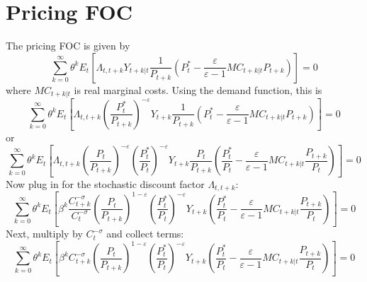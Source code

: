 \documentclass[12pt,a4paper]{article}
\begin{document}
\section{Pricing FOC}
The pricing FOC is given by
\begin{equation}\sum\limits_{k = 0}^\infty  {{\theta ^k}{E_t}\left[ {{\Lambda _{t,t + k}}{Y_{t + k|t}}\frac{1}{{{P_{t + k}}}}\left( {P_t^* - \frac{\varepsilon }{{\varepsilon  - 1}}M{C_{t + k|t}}{P_{t + k}}} \right)} \right]}  = 0\end{equation}
where ${M{C_{t + k|t}}}$ is real marginal costs. Using the demand function, this is
\begin{equation}\sum\limits_{k = 0}^\infty  {{\theta ^k}{E_t}\left[ {{\Lambda _{t,t + k}}{{\left( {\frac{{P_t^*}}{{{P_{t + k}}}}} \right)}^{ - \varepsilon }}{Y_{t + k}}\frac{1}{{{P_{t + k}}}}\left( {P_t^* - \frac{\varepsilon }{{\varepsilon  - 1}}M{C_{t + k|t}}{P_{t + k}}} \right)} \right]}  = 0\end{equation}
or
\begin{equation}\sum\limits_{k = 0}^\infty  {{\theta ^k}{E_t}\left[ {{\Lambda _{t,t + k}}{{\left( {\frac{{{P_t}}}{{{P_{t + k}}}}} \right)}^{ - \varepsilon }}{{\left( {\frac{{P_t^*}}{{{P_t}}}} \right)}^{ - \varepsilon }}{Y_{t + k}}\frac{{{P_t}}}{{{P_{t + k}}}}\left( {\frac{{P_t^*}}{{{P_t}}} - \frac{\varepsilon }{{\varepsilon  - 1}}M{C_{t + k|t}}\frac{{{P_{t + k}}}}{{{P_t}}}} \right)} \right]}  = 0\end{equation}
Now plug in for the stochastic discount factor $\Lambda_{t,t+k}$:
\begin{equation}\sum\limits_{k = 0}^\infty  {{\theta ^k}{E_t}\left[ {{\beta ^k}\frac{{C_{t + k}^{ - \sigma }}}{{C_t^{ - \sigma }}}{{\left( {\frac{{{P_t}}}{{{P_{t + k}}}}} \right)}^{1 - \varepsilon }}{{\left( {\frac{{P_t^*}}{{{P_t}}}} \right)}^{ - \varepsilon }}{Y_{t + k}}\left( {\frac{{P_t^*}}{{{P_t}}} - \frac{\varepsilon }{{\varepsilon  - 1}}M{C_{t + k|t}}\frac{{{P_{t + k}}}}{{{P_t}}}} \right)} \right]}  = 0\end{equation}
Next, multiply by $C_t^{-\sigma}$ and collect terms:
\begin{equation}\sum\limits_{k = 0}^\infty  {{\theta ^k}{E_t}\left[ {{\beta ^k}C_{t + k}^{ - \sigma }{{\left( {\frac{{{P_t}}}{{{P_{t + k}}}}} \right)}^{1 - \varepsilon }}{{\left( {\frac{{P_t^*}}{{{P_t}}}} \right)}^{ - \varepsilon }}{Y_{t + k}}\left( {\frac{{P_t^*}}{{{P_t}}} - \frac{\varepsilon }{{\varepsilon  - 1}}M{C_{t + k|t}}\frac{{{P_{t + k}}}}{{{P_t}}}} \right)} \right]}  = 0\end{equation}
\end{document}
